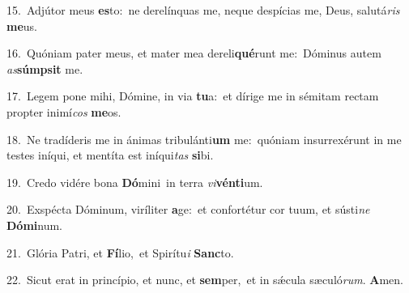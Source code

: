 {\numbfont\textcolor{\numbcolor}{15.}}~Adjútor meus \textbf{es}\-to:~\star ne derelínquas me, neque despícias me, Deus, salutá\textit{ris} \textbf{me}\-us.\par
{\numbfont\textcolor{\numbcolor}{16.}}~Quóniam pater meus, et mater mea dereli\-\textbf{qué}\-runt me:~\star Dóminus autem \textit{as}\-\textbf{súmp}\textbf{sit} me.\par
{\numbfont\textcolor{\numbcolor}{17.}}~Legem pone mihi, Dómine, in via \textbf{tu}\-a:~\star et dírige me in sémitam rectam propter inimí\textit{cos} \textbf{me}\-os.\par
{\numbfont\textcolor{\numbcolor}{18.}}~Ne tradíderis me in ánimas tribulánti\textbf{um} me:~\star quóniam insurrexérunt in me testes iníqui, et mentíta est iníqui\textit{tas} \textbf{si}\-bi.\par
{\numbfont\textcolor{\numbcolor}{19.}}~Credo vidére bona \textbf{Dó}\-mini~\star in terra \textit{vi}\-\textbf{vén}\textbf{ti}um.\par
{\numbfont\textcolor{\numbcolor}{20.}}~Exspécta Dóminum, viríliter \textbf{a}\-ge:~\star et confortétur cor tuum, et sústi\textit{ne} \textbf{Dó}\-\textbf{mi}num.\par
{\numbfont\textcolor{\numbcolor}{21.}}~Glória Patri, et \textbf{Fí}\-lio,~\star et Spirítu\textit{i} \textbf{Sanc}\-to.\par
{\numbfont\textcolor{\numbcolor}{22.}}~Sicut erat in princípio, et nunc, et \textbf{sem}\-per,~\star et in sǽcula sæculó\-\textit{rum}\-. \textbf{A}\-men.\par
